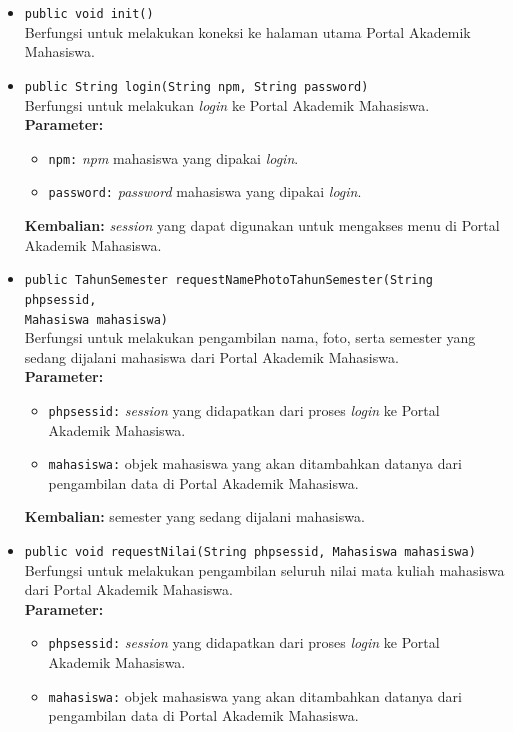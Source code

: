 \begin{enumerate}
\begin{itemize}
        \item \texttt{public void init()}\\
			Berfungsi untuk melakukan koneksi ke halaman utama Portal Akademik Mahasiswa.

		\item \texttt{public String login(String npm, String password)}\\
		    Berfungsi untuk melakukan \textit{login} ke Portal Akademik Mahasiswa.\\
		\textbf{Parameter:}
			\begin{itemize}
				\item \texttt{npm:} \textit{npm} mahasiswa yang dipakai \textit{login}.
				\item \texttt{password:} \textit{password} mahasiswa yang dipakai \textit{login}.
			\end{itemize}
		\textbf{Kembalian:} \textit{session} yang dapat digunakan untuk mengakses menu di Portal Akademik Mahasiswa.
		
	    \item \texttt{public TahunSemester requestNamePhotoTahunSemester(String phpsessid,\\ Mahasiswa mahasiswa)}\\
		    Berfungsi untuk melakukan pengambilan nama, foto, serta semester yang sedang dijalani mahasiswa dari Portal Akademik Mahasiswa.\\
		\textbf{Parameter:}
			\begin{itemize}
				\item \texttt{phpsessid:} \textit{session} yang didapatkan dari proses \textit{login} ke Portal Akademik Mahasiswa.
				\item \texttt{mahasiswa:} objek mahasiswa yang akan ditambahkan datanya dari pengambilan data di Portal Akademik Mahasiswa.
			\end{itemize}
		\textbf{Kembalian:} semester yang sedang dijalani mahasiswa.
		
		\item \texttt{public void requestNilai(String phpsessid, Mahasiswa mahasiswa)}\\
		    Berfungsi untuk melakukan pengambilan seluruh nilai mata kuliah mahasiswa dari Portal Akademik Mahasiswa.\\
		\textbf{Parameter:}
			\begin{itemize}
				\item \texttt{phpsessid:} \textit{session} yang didapatkan dari proses \textit{login} ke Portal Akademik Mahasiswa.
				\item \texttt{mahasiswa:} objek mahasiswa yang akan ditambahkan datanya dari pengambilan data di Portal Akademik Mahasiswa.
			\end{itemize}
			

\end{itemize}
\end{enumerate}
